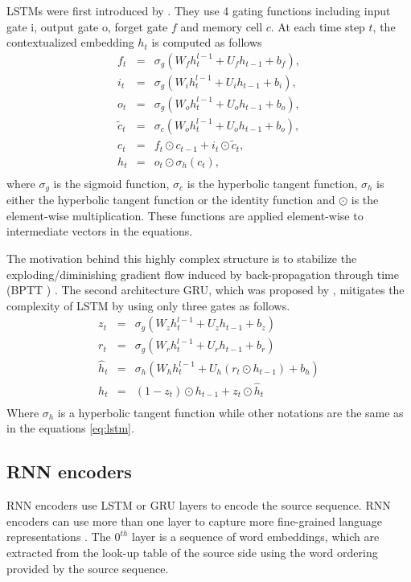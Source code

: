 LSTMs were first introduced by \citet{Hochreiter97long}. They use 4 gating functions including input gate i, output gate o, forget gate $f$ and memory cell $c$. At each time step $t$, the contextualized embedding $h_t$ is computed as follows
\begin{equation}
\label{eq:lstm}
\begin{array}{rcl}
f_t &=& \sigma_g (W_f h^{l-1}_t + U_f h_{t-1} + b_f),\\
i_t &=& \sigma_g (W_i h^{l-1}_t + U_i h_{t-1} + b_i),\\
o_t &=& \sigma_g (W_o h^{l-1}_t + U_o h_{t-1} + b_o),\\
\tilde{c}_t &=& \sigma_c (W_o h^{l-1}_t + U_o h_{t-1} + b_o),\\
c_t &=& f_t \odot c_{t-1} + i_t \odot \tilde{c}_t,\\
h_t &=& o_t \odot \sigma_h(c_t),\\
\end{array}
\end{equation}
where $\sigma_g$ is the sigmoid function, $\sigma_c$ is the hyperbolic tangent function, $\sigma_h$ is either the hyperbolic tangent function or the identity function and $\odot$ is the element-wise multiplication. These functions are applied element-wise to intermediate vectors in the equations.

The motivation behind this highly complex structure is to stabilize the exploding/diminishing gradient flow \citep{Pascanu13onthe} induced by back-propagation through time (BPTT ) \citep{Hochreiter97long}. The second architecture GRU, which was proposed by \citet{Cho14properties}, mitigates the complexity of LSTM by using only three gates as follows.
\begin{equation}
\label{eq:gru}
\begin{array}{rcl}
z_t &=& \sigma_g (W_z h^{l-1}_t + U_z h_{t-1} + b_z)\\
r_t &=& \sigma_g (W_r h^{l-1}_t + U_r h_{t-1} + b_r)\\
\hat{h}_t &=& \sigma_h (W_h h^{l-1}_t + U_h (r_t \odot h_{t-1}) + b_h)\\
h_t &=& (1-z_t)\odot h_{t-1} + z_t \odot \hat{h}_t\\
\end{array}
\end{equation}
Where $\sigma_h$ is a hyperbolic tangent function while other notations are the same as in the equations \ref{eq:lstm}.
\subsection{RNN encoders}
RNN encoders use LSTM or GRU layers to encode the source sequence. RNN encoders can use more than one layer to capture more fine-grained language representations \citep{Li20shallow}. The $0^{th}$ layer is a sequence of word embeddings, which are extracted from the look-up table of the source side using the word ordering provided by the source sequence. 

